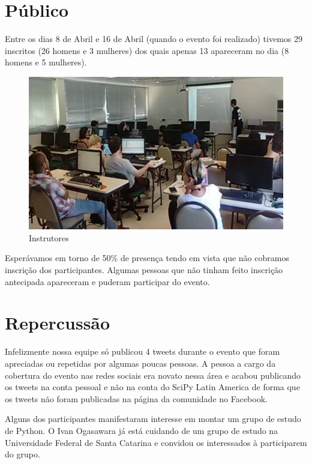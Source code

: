 \documentclass[12pt]{article}
\begin{document}
\newpage

\section*{Público}

Entre os dias 8 de Abril e 16 de Abril (quando o evento foi realizado)
tivemos 29 inscritos (26 homens e 3 mulheres) dos quais apenas 13 apareceram no
dia (8 homens e 5 mulheres).

\begin{figure}[!htb]
\includegraphics[width=\textwidth]{../../media/photos/pre0-cut}
\caption{Instrutores}
\end{figure}

Esperávamos em torno de 50\% de presença tendo em vista que não cobramos
inscrição dos participantes.
Algumas pessoas que não tinham feito inscrição antecipada apareceram e puderam
participar do evento.


\newpage

\section*{Repercussão}

Infelizmente nossa equipe só publicou 4 tweets durante o evento que foram
apreciadas ou repetidas por algumas poucas pessoas.
A pessoa a cargo da cobertura do evento nas redes sociais era novato nessa área
e acabou publicando os tweets na conta pessoal e não na conta do SciPy Latin
America de forma que os tweets não foram publicadas na página da comunidade no
Facebook.

Alguns dos participantes manifestaram interesse em montar um grupo de estudo de
Python. O Ivan Ogasawara já está cuidando de um grupo de estudo na Universidade
Federal de Santa Catarina e convidou os interessados à participarem do grupo.
\end{document}
